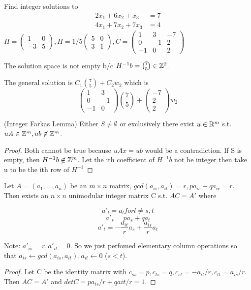 \begin{example}
Find integer solutions to 
 \begin{align*}
	2x_1 + 6x_2 + x_3 & = 7 \\
	4x_1 + 7x_2 + 7x_3 & = 4
\end{align*}
$H = \left(\begin{matrix}
	 1 & 0 \\
	-3 & 5
	\end{matrix}\right), 
H = 1/5\left(\begin{matrix}
	 5 & 0 \\
	3 & 1
	\end{matrix}\right) , 
C = \left(\begin{matrix}
	 1 & 3  &-7 \\
	 0 &-1  & 2 \\
	-1 & 0  & 2 
	\end{matrix}\right)
$

The solution space is not empty b/c $H^{-1}b = \binom {7} {5} \in \mathbb Z^2$.

The general solution is $C_1 \binom {7} {5} + C_2w_2$ which is 
\[
	\left(\begin{matrix}
	1 & 3\\
	0 & -1\\
      -1& 0
	\end{matrix}\right) \binom{7}{5} + 
	\left(\begin{matrix}
	-7\\
	2\\
      2
	\end{matrix}\right)w_2
\]

\end{example}




\begin{corollary}(Integer Farkas Lemma)
Either $S \neq \emptyset$ or exclusively there exist $u \in \mathbb R^m$ s.t. $uA \in \mathbb Z^m, ub \not \in \mathbb Z^m$.
\end{corollary}

\begin{proof}
Both cannot be true because $uAx = ub$ would be a contradiction. If S is empty, then $H^{-1}b \not \in \mathbb Z^m$. Let the ith coefficient of $H^{-1}b$ not be integer then take u to be the ith row of $H^{-1}$
\end{proof}


\begin{lemma}
Let $A = (a_1, \dots, a_n)$ be an $m \times n$ matrix, $gcd(a_{is}, a_{it}) = r, pa_{is} + qa_{ir} = r$. Then exists an $n \times n$ unimodular integer matrix C s.t. $AC = A'$ where

\[	a'_l = a_l for l \neq s, t \]
\[	a'_s = pa_s + qa_t \]
\[	a'_t = -\frac{a_{it}}{r}a_s + \frac{a_{is}}{r}a_t \]

Note: $a'_{is} = r, a'_{it}= 0.$ So we just perfomed elementary column operations so that $a_{is} \leftarrow gcd(a_{is}, a_{it}), a_{it} \leftarrow 0$ ($s < t$).
\end{lemma}
\begin{proof}
Let C be the identity matrix with $c_{ss} = p, c_{ts} = q, c_{st} = -a_{it}/r, c_{tt}= a_{is}/r$. Then $AC = A'$ and $det C = pa_{is}/r + qa{it}/r = 1$.
\end{proof}

